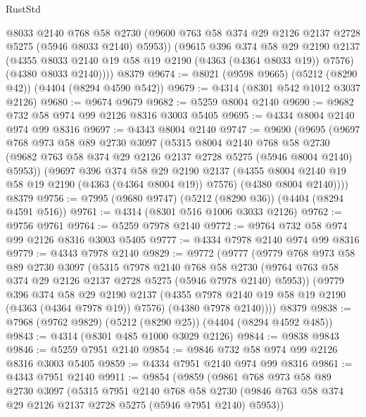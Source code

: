 \begin{lexlean}{RustStd}
\begin{coremodule}
          @8033
          @2140
          @768
          @58
          @2730
          (@9600 @763 @58 @374 @29 @2126 @2137 @2728 @5275 (@5946 @8033 @2140) @5953))
        (@9615
          @396
          @374
          @58
          @29
          @2190
          @2137
          (@4355 @8033 @2140 @19 @58 @19 @2190 (@4363 (@4364 @8033 @19)) @7576)
          (@4380 @8033 @2140))))
    @8379
@9674 := @8021 (@9598 @9665) (@5212 (@8290 @42)) (@4404 (@8294 @4590 @542))
@9679 := @4314 (@8301 @542 @1012 @3037 @2126)
@9680 := @9674 @9679
@9682 := @5259 @8004 @2140
@9690 := @9682 @732 @58 @974 @99 @2126 @8316 @3003 @5405
@9695 := @4334 @8004 @2140 @974 @99 @8316
@9697 := @4343 @8004 @2140
@9747 := @9690
    (@9695
      (@9697
        @768
        @973
        @58
        @89
        @2730
        @3097
        (@5315
          @8004
          @2140
          @768
          @58
          @2730
          (@9682 @763 @58 @374 @29 @2126 @2137 @2728 @5275 (@5946 @8004 @2140) @5953))
        (@9697
          @396
          @374
          @58
          @29
          @2190
          @2137
          (@4355 @8004 @2140 @19 @58 @19 @2190 (@4363 (@4364 @8004 @19)) @7576)
          (@4380 @8004 @2140))))
    @8379
@9756 := @7995 (@9680 @9747) (@5212 (@8290 @36)) (@4404 (@8294 @4591 @516))
@9761 := @4314 (@8301 @516 @1006 @3033 @2126)
@9762 := @9756 @9761
@9764 := @5259 @7978 @2140
@9772 := @9764 @732 @58 @974 @99 @2126 @8316 @3003 @5405
@9777 := @4334 @7978 @2140 @974 @99 @8316
@9779 := @4343 @7978 @2140
@9829 := @9772
    (@9777
      (@9779
        @768
        @973
        @58
        @89
        @2730
        @3097
        (@5315
          @7978
          @2140
          @768
          @58
          @2730
          (@9764 @763 @58 @374 @29 @2126 @2137 @2728 @5275 (@5946 @7978 @2140) @5953))
        (@9779
          @396
          @374
          @58
          @29
          @2190
          @2137
          (@4355 @7978 @2140 @19 @58 @19 @2190 (@4363 (@4364 @7978 @19)) @7576)
          (@4380 @7978 @2140))))
    @8379
@9838 := @7968 (@9762 @9829) (@5212 (@8290 @25)) (@4404 (@8294 @4592 @485))
@9843 := @4314 (@8301 @485 @1000 @3029 @2126)
@9844 := @9838 @9843
@9846 := @5259 @7951 @2140
@9854 := @9846 @732 @58 @974 @99 @2126 @8316 @3003 @5405
@9859 := @4334 @7951 @2140 @974 @99 @8316
@9861 := @4343 @7951 @2140
@9911 := @9854
    (@9859
      (@9861
        @768
        @973
        @58
        @89
        @2730
        @3097
        (@5315
          @7951
          @2140
          @768
          @58
          @2730
          (@9846 @763 @58 @374 @29 @2126 @2137 @2728 @5275 (@5946 @7951 @2140) @5953))

\end{coremodule}
\end{lexlean}
